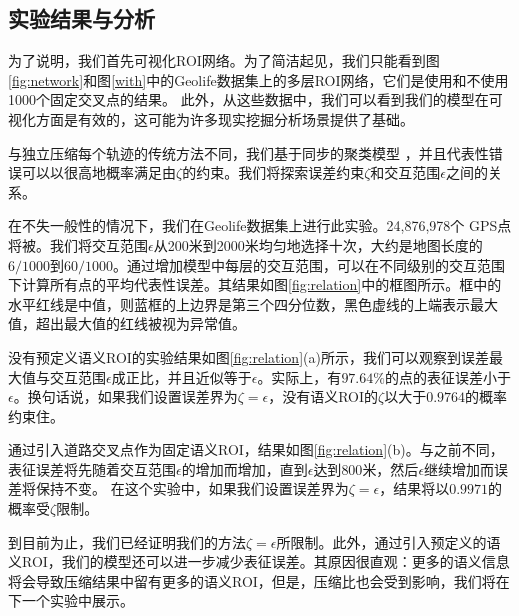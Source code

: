
\subsection{实验结果与分析}
为了说明，我们首先可视化ROI网络。为了简洁起见，我们只能看到图\ref{fig:network}和图\ref{with}中的Geolife数据集上的多层ROI网络，它们是使用和不使用1000个固定交叉点的结果。 此外，从这些数据中，我们可以看到我们的模型在可视化方面是有效的，这可能为许多现实挖掘分析场景提供了基础。


与独立压缩每个轨迹的传统方法不同，我们基于同步的聚类模型 ，并且代表性错误可以以很高地概率满足由$\zeta$的约束。我们将探索误差约束$\zeta$和交互范围$\epsilon$之间的关系。

在不失一般性的情况下，我们在Geolife数据集上进行此实验。24,876,978个 GPS点将被。我们将交互范围$\epsilon$从200米到2000米均匀地选择十次，大约是地图长度的$6/1000$到$60/1000$。通过增加模型中每层的交互范围，可以在不同级别的交互范围下计算所有点的平均代表性误差。其结果如图\ref{fig:relation}中的框图所示。框中的水平红线是中值，则蓝框的上边界是第三个四分位数，黑色虚线的上端表示最大值，超出最大值的红线被视为异常值。

没有预定义语义ROI的实验结果如图\ref{fig:relation}(a)所示，我们可以观察到误差最大值与交互范围$\epsilon$成正比，并且近似等于$\epsilon$。实际上，有$97.64\%$的点的表征误差小于$\epsilon$。换句话说，如果我们设置误差界为$\zeta=\epsilon$，没有语义ROI的$\zeta$以大于$0.9764$的概率约束住。

通过引入道路交叉点作为固定语义ROI，结果如图\ref{fig:relation}(b)。与之前不同，表征误差将先随着交互范围$\epsilon$的增加而增加，直到$\epsilon$达到$800$米，然后$\epsilon$继续增加而误差将保持不变。 在这个实验中，如果我们设置误差界为$ \zeta =\epsilon $，结果将以$ 0.9971 $的概率受$ \zeta $限制。

到目前为止，我们已经证明我们的方法$ \zeta = \epsilon$所限制。此外，通过引入预定义的语义ROI，我们的模型还可以进一步减少表征误差。其原因很直观：更多的语义信息将会导致压缩结果中留有更多的语义ROI，但是，压缩比也会受到影响，我们将在下一个实验中展示。

